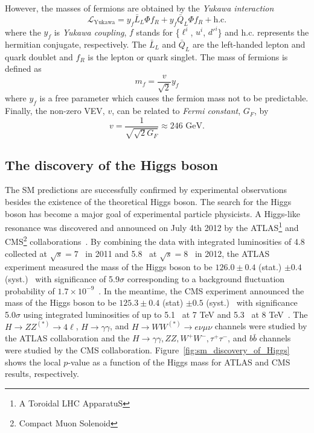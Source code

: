 %
However, the masses of fermions are obtained by the \textit{Yukawa interaction}
%
\begin{equation}
    \mathcal{L}_{\textrm{Yukawa}} = y_{f} \bar{L}_{L} \Phi f_{R} + y_{f} \bar{Q}_{L} \Phi f_{R} + \textrm{h.c.}
\end{equation}
%
where the $y_{f}$ is \textit{Yukawa coupling}, $f$ stands for \{$\ell^{i}$, $u^{i}$, $d'^{i}$\} and h.c. represents the hermitian conjugate, respectively.
The $\bar{L}_{L}$ and $\bar{Q}_{L}$ are the left-handed lepton and quark doublet and $f_{R}$ is the lepton or quark singlet.
The mass of fermions is defined as
%
\begin{equation}
    m_{f} = \frac{v}{\sqrt{2}}y_{f}
\end{equation}
%
where $y_{f}$ is a free parameter which causes the fermion mass not to be predictable.
Finally, the non-zero VEV, $v$, can be related to \textit{Fermi constant}, $G_{F}$, by
%
\begin{equation}
    v = \frac{1}{\sqrt{\sqrt{2} G_{F}}} \approx 246 \textrm{~{GeV}}.
\end{equation}
%


\subsection{The discovery of the Higgs boson}
The SM predictions are successfully confirmed by experimental observations besides the existence of the theoretical Higgs boson. 
The search for the Higgs boson has become a major goal of experimental particle physicists.
A Higgs-like resonance was discovered and announced on July 4th 2012 by the ATLAS\footnote{A Toroidal LHC ApparatuS} and CMS\footnote{Compact Muon Solenoid} collaborations~\cite{Aad:2012tfa, Chatrchyan:2012xdj}.
By combining the data with integrated luminosities of 4.8~{\ifb} collected at $\sqrt{s} = 7$~{\TeV} in 2011 and 5.8~{\ifb} at $\sqrt{s}=8$~{\TeV} in 2012, the ATLAS experiment measured the mass of the Higgs boson to be $126.0 \pm 0.4$ (stat.) $\pm 0.4$ (syst.)~{\GeV} with significance of 5.9$\sigma$ corresponding to a background fluctuation probability of $1.7 \times 10^{-9}$~\cite{Aad:2012tfa}.
In the meantime, the CMS experiment announced the mass of the Higgs boson to be $125.3 \pm 0.4$ (stat) $\pm 0.5$ (syst.)~{\GeV} with significance 5.0$\sigma$ using integrated luminosities of up to 5.1~{\ifb} at 7 TeV and 5.3~{\ifb} at 8 TeV~\cite{Chatrchyan:2012xdj}. 
The $H \rightarrow ZZ^{(*)} \rightarrow 4\ell$, $H \rightarrow \gamma \gamma$, and $H \rightarrow WW^{(*)} \rightarrow e\nu\mu\nu$ channels were studied by the ATLAS collaboration and the $H \rightarrow \gamma \gamma, ZZ, W^{+}W^{-}, \tau^{+}\tau^{-}$, and $b\bar{b}$ channels were studied by the CMS collaboration.
Figure~\ref{fig:sm_discovery_of_Higgs} shows the local $p$-value as a function of the Higgs mass for ATLAS and CMS results, respectively.

